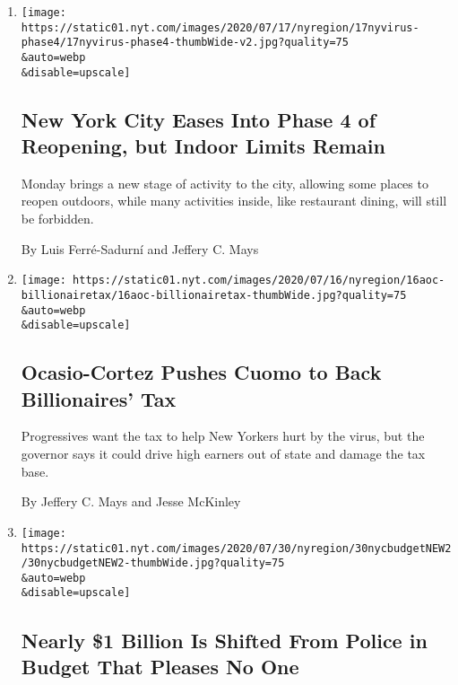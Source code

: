 \begin{enumerate}
\def\labelenumi{\arabic{enumi}.}
\item
  \href{/2020/07/17/nyregion/phase-4-nyc-reopen.html}{}

  \texttt{[image: https://static01.nyt.com/images/2020/07/17/nyregion/17nyvirus-phase4/17nyvirus-phase4-thumbWide-v2.jpg?quality=75\\\&auto=webp\\\&disable=upscale]}

  \hypertarget{new-york-city-eases-into-phase-4-of-reopening-but-indoor-limits-remain}{%
  \subsection{New York City Eases Into Phase 4 of Reopening, but Indoor
  Limits
  Remain}\label{new-york-city-eases-into-phase-4-of-reopening-but-indoor-limits-remain}}

  Monday brings a new stage of activity to the city, allowing some
  places to reopen outdoors, while many activities inside, like
  restaurant dining, will still be forbidden.

  By Luis Ferré-Sadurní and Jeffery C. Mays
\item
  \href{/2020/07/16/nyregion/aoc-billionaires-tax.html}{}

  \texttt{[image: https://static01.nyt.com/images/2020/07/16/nyregion/16aoc-billionairetax/16aoc-billionairetax-thumbWide.jpg?quality=75\\\&auto=webp\\\&disable=upscale]}

  \hypertarget{ocasio-cortez-pushes-cuomo-to-back-billionaires-tax}{%
  \subsection{Ocasio-Cortez Pushes Cuomo to Back Billionaires'
  Tax}\label{ocasio-cortez-pushes-cuomo-to-back-billionaires-tax}}

  Progressives want the tax to help New Yorkers hurt by the virus, but
  the governor says it could drive high earners out of state and damage
  the tax base.

  By Jeffery C. Mays and Jesse McKinley
\item
  \href{/2020/06/30/nyregion/nypd-budget.html}{}

  \texttt{[image: https://static01.nyt.com/images/2020/07/30/nyregion/30nycbudgetNEW2/30nycbudgetNEW2-thumbWide.jpg?quality=75\\\&auto=webp\\\&disable=upscale]}

  \hypertarget{nearly-1-billion-is-shifted-from-police-in-budget-that-pleases-no-one}{%
  \subsection{Nearly \$1 Billion Is Shifted From Police in Budget That
  Pleases No
  One}\label{nearly-1-billion-is-shifted-from-police-in-budget-that-pleases-no-one}}


\end{enumerate}
